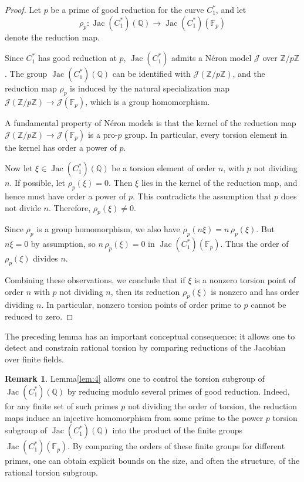 \documentclass[12pt, reqno]{amsart}
\numberwithin{equation}{section}
\theoremstyle{definition}
\newtheorem{remark}[thm]{Remark}
\theoremstyle{nodefstyle}
\newcommand{\Jac}{\operatorname{Jac}}
\begin{document}
\begin{proof}
Let $p$ be a prime of good reduction for the curve $C_1^*$, and let
\[
\rho_p : \Jac(C_1^*)(\mathbb{Q}) \longrightarrow \Jac(C_1^*)(\mathbb{F}_p)
\]
denote the reduction map.

Since $C_1^*$ has good reduction at $p$, $\Jac(C_1^*)$ admits a Néron model $\mathcal{J}$ over $\mathbb{Z}/{p\mathbb{Z}}$. 
The group $\Jac(C_1^*)(\mathbb{Q})$ can be identified with $\mathcal{J}(\mathbb{Z}/{p\mathbb{Z}})$, and the reduction map $\rho_p$ is induced by the natural specialization map $\mathcal{J}(\mathbb{Z}/{p\mathbb{Z}}) \longrightarrow \mathcal{J}(\mathbb{F}_p)$, which is a group homomorphism.

A fundamental property of Néron models is that the kernel of the reduction map $\mathcal{J}(\mathbb{Z}/{p\mathbb{Z}}) \longrightarrow \mathcal{J}(\mathbb{F}_p)$ is a pro-$p$ group. In particular, every torsion element in the kernel has order a power of $p$.

Now let $\xi \in \Jac(C_1^*)(\mathbb{Q})$ be a torsion element of order $n$, with $p$ not dividing $n$. 
If possible, let $\rho_p(\xi)=0$. 
Then $\xi$ lies in the kernel of the reduction map, and hence must have order a power of $p$. 
This contradicts the assumption that $p$ does not divide $n$. 
Therefore, $\rho_p(\xi) \neq 0$.

Since $\rho_p$ is a group homomorphism, we also have $\rho_p(n\xi) = n\,\rho_p(\xi)$. But $n\xi=0$ by assumption, so $n\,\rho_p(\xi)=0$ in $\Jac(C_1^*)(\mathbb{F}_p)$. 
Thus the order of $\rho_p(\xi)$ divides $n$.

Combining these observations, we conclude that if $\xi$ is a nonzero torsion point of order $n$ with $p$ not dividing $n$, then its reduction $\rho_p(\xi)$ is nonzero and has order dividing $n$. 
In particular, nonzero torsion points of order prime to $p$ cannot be reduced to zero.
\end{proof}

The preceding lemma has an important conceptual consequence: it allows one to detect and constrain rational torsion by comparing reductions of the Jacobian over finite fields.

\begin{remark}
Lemma\autoref{lem:4} allows one to control the torsion subgroup of $\Jac(C_1^*)(\mathbb{Q})$ by reducing modulo several primes of good reduction. 
Indeed, for any finite set of such primes $p$ not dividing the order of torsion, the reduction maps induce an injective homomorphism from some prime to the power $p$ torsion subgroup of $\Jac(C_1^*)(\mathbb{Q})$ into the product of the finite groups $\Jac(C_1^*)(\mathbb{F}_p)$. 
By comparing the orders of these finite groups for different primes, one can obtain explicit bounds on the size, and often the structure, of the rational torsion subgroup.
\end{remark}
\end{document}
